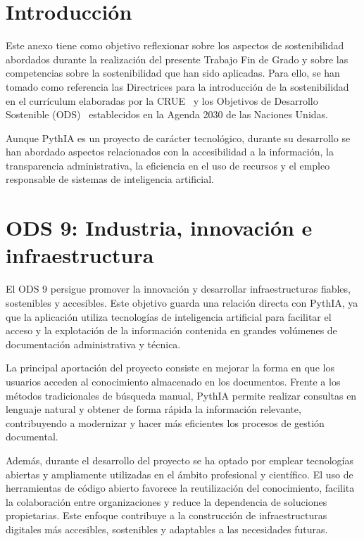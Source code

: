 
\section{Introducción}

Este anexo tiene como objetivo reflexionar sobre los aspectos de sostenibilidad abordados durante la realización del presente Trabajo Fin de Grado y sobre las competencias sobre la sostenibilidad que han sido aplicadas. Para ello, se han tomado como referencia las Directrices para la introducción de la sostenibilidad en el currículum elaboradas por la CRUE~\cite{ODS:CRUE} y los Objetivos de Desarrollo Sostenible (ODS)~\cite{ODS:Naciones_unidas} establecidos en la Agenda 2030 de las Naciones Unidas.

Aunque PythIA es un proyecto de carácter tecnológico, durante su desarrollo se han abordado aspectos relacionados con la accesibilidad a la información, la transparencia administrativa, la eficiencia en el uso de recursos y el empleo responsable de sistemas de inteligencia artificial.

\section{ODS 9: Industria, innovación e infraestructura}

El ODS 9 persigue promover la innovación y desarrollar infraestructuras fiables, sostenibles y accesibles. Este objetivo guarda una relación directa con PythIA, ya que la aplicación utiliza tecnologías de inteligencia artificial para facilitar el acceso y la explotación de la información contenida en grandes volúmenes de documentación administrativa y técnica.

La principal aportación del proyecto consiste en mejorar la forma en que los usuarios acceden al conocimiento almacenado en los documentos. Frente a los métodos tradicionales de búsqueda manual, PythIA permite realizar consultas en lenguaje natural y obtener de forma rápida la información relevante, contribuyendo a modernizar y hacer más eficientes los procesos de gestión documental.

Además, durante el desarrollo del proyecto se ha optado por emplear tecnologías abiertas y ampliamente utilizadas en el ámbito profesional y científico. El uso de herramientas de código abierto favorece la reutilización del conocimiento, facilita la colaboración entre organizaciones y reduce la dependencia de soluciones propietarias. Este enfoque contribuye a la construcción de infraestructuras digitales más accesibles, sostenibles y adaptables a las necesidades futuras.

